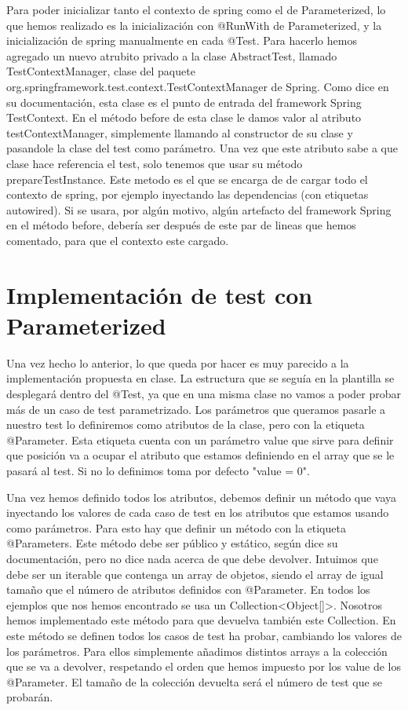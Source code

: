 \documentclass[a4paper]{article}
\begin{document}
Para poder inicializar tanto el contexto de spring como el de Parameterized, lo que hemos realizado es la inicialización con @RunWith de Parameterized, y la inicialización de spring manualmente en cada @Test. Para hacerlo hemos agregado un nuevo atrubito privado a la clase AbstractTest, llamado TestContextManager, clase del paquete org.springframework.test.context.TestContextManager de Spring. Como dice en su documentación, esta clase es el punto de entrada del framework Spring TestContext. En el método before de esta clase le damos valor al atributo testContextManager, simplemente llamando al constructor de su clase y pasandole la clase del test como parámetro. Una vez que este atributo sabe a que clase hace referencia el test, solo tenemos que usar su método prepareTestInstance. Este metodo es el que se encarga de de cargar todo el contexto de spring, por ejemplo inyectando las dependencias (con etiquetas autowired). Si se usara, por algún motivo, algún artefacto del framework Spring en el método before, debería ser después de este par de lineas que hemos comentado, para que el contexto este cargado.

\section{Implementación de test con Parameterized}

Una vez hecho lo anterior, lo que queda por hacer es muy parecido a la implementación propuesta en clase. La estructura que se seguía en la plantilla se desplegará dentro del @Test, ya que en una misma clase no vamos a poder probar más de un caso de test parametrizado. Los parámetros que queramos pasarle a nuestro test lo definiremos como atributos de la clase, pero con la etiqueta @Parameter. Esta etiqueta cuenta con un parámetro value que sirve para definir que posición va a ocupar el atributo que estamos definiendo en el array que se le pasará al test. Si no lo definimos toma por defecto "value = 0".

Una vez hemos definido todos los atributos, debemos definir un método que vaya inyectando los valores de cada caso de test en los atributos que estamos usando como parámetros. Para esto hay que definir un método con la etiqueta @Parameters. Este método debe ser público y estático, según dice su documentación, pero no dice nada acerca de que debe devolver. Intuimos que debe ser un iterable que contenga un array de objetos, siendo el array de igual tamaño que el número de atributos definidos con @Parameter. En todos los ejemplos que nos hemos encontrado se usa un Collection<Object[]>. Nosotros hemos implementado este método para que devuelva también este Collection. En este método se definen todos los casos de test ha probar, cambiando los valores de los parámetros. Para ellos simplemente añadimos distintos arrays a la colección que se va a devolver, respetando el orden que hemos impuesto por los value de los @Parameter. El tamaño de la colección devuelta será el número de test que se probarán.
\end{document}
